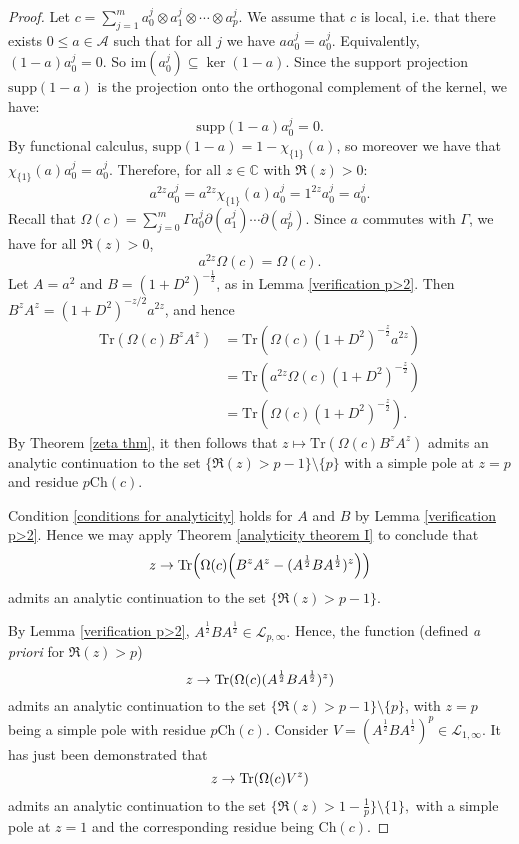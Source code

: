\begin{proof}
        Let $c = \sum_{j=1}^m a^{j}_0\otimes a^j_1\otimes\cdots\otimes a^j_p$. We assume that $c$ is local, i.e. that there exists $0 \leq a \in \mathcal{A}$ such that 
        for all $j$ we have $aa^j_0 = a^j_0$. Equivalently, $(1-a)a^j_0 = 0$. So $\mathrm{im}(a^j_0) \subseteq \ker(1-a)$. Since the support projection $\mathrm{supp}(1-a)$
        is the projection onto the orthogonal complement of the kernel, we have:
        \begin{equation*}
            \mathrm{supp}(1-a)a^j_0 = 0.
        \end{equation*}
        By functional calculus, $\mathrm{supp}(1-a) = 1-\chi_{\{1\}}(a)$, so moreover we have that $\chi_{\{1\}}(a)a^j_0 = a^j_0$. Therefore, for all $z \in \mathbb{C}$ with $\Re(z) > 0$:
        $$a^{2z}a_0^j=a^{2z}\chi_{\{1\}}(a)a_0^j=1^{2z}a_0^j=a_0^j.$$
        Recall that $\Omega(c) = \sum_{j=0}^m \Gamma a_0^j\partial(a_1^j)\cdots \partial(a_p^j)$. Since $a$ commutes with $\Gamma$, we have for all $\Re(z) > 0$,
        \begin{equation}\label{omega is local}
            a^{2z}\Omega(c) = \Omega(c).
        \end{equation}
        Let $A=a^2$ and $B=(1+D^2)^{-\frac12}$, as in Lemma \ref{verification p>2}. Then $B^zA^z = (1+D^2)^{-z/2}a^{2z}$, and hence
        \begin{align*}
            \mathrm{Tr}(\Omega(c)B^zA^z) &= \mathrm{Tr}(\Omega(c)(1+D^2)^{-\frac{z}{2}}a^{2z})\\
                                 &= \mathrm{Tr}(a^{2z}\Omega(c)(1+D^2)^{-\frac{z}{2}})\\
                                 &= \mathrm{Tr}(\Omega(c)(1+D^2)^{-\frac{z}{2}}).
        \end{align*}
        By Theorem \ref{zeta thm}, it then follows that $z\mapsto \mathrm{Tr}(\Omega(c)B^zA^z)$        
        admits an analytic continuation to the set $\{\Re(z)>p-1\}\setminus \{p\}$ with a simple pole at $z = p$
        and residue $p\mathrm{Ch}(c)$.
        
        Condition \ref{conditions for analyticity} holds for $A$ and $B$ by Lemma \ref{verification p>2}. Hence we may apply Theorem \ref{analyticity theorem I} to conclude that
        $$z\to{\rm Tr}\Big(\Omega(c)\Big(B^zA^z-(A^{\frac12}BA^{\frac12})^z\Big)\Big)$$
        admits an analytic continuation to the set $\{\Re(z)>p-1\}.$

        By Lemma \ref{verification p>2}, $A^{\frac12}BA^{\frac12}\in\mathcal{L}_{p,\infty}.$ Hence, the function (defined {\it a priori} for $\Re(z)>p$)
        $$z\to{\rm Tr}(\Omega(c)(A^{\frac12}BA^{\frac12})^z)$$
        admits an analytic continuation to the set $\{\Re(z)>p-1\}\setminus \{p\}$, with $z=p$ being a simple pole with residue $p\mathrm{Ch}(c).$ 
        Consider $V=(A^{\frac12}BA^{\frac12})^p\in\mathcal{L}_{1,\infty}.$ 
        It has just been demonstrated that
        $$z\to{\rm Tr}(\Omega(c)V^z)$$
        admits an analytic continuation to the set $\{\Re(z)>1-\frac1p\}\setminus \{1\},$ with a simple pole at $z=1$ and the corresponding residue being $\mathrm{Ch}(c).$


\end{proof}
